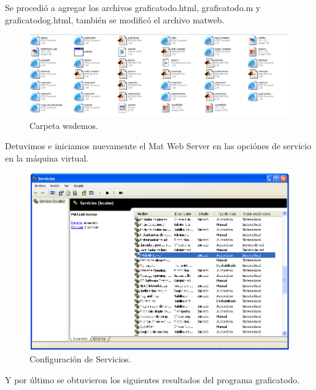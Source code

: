 \documentclass[12pt,letterpaper]{article}
\begin{document}
\begin{multicols}{2}
Se procedió a agregar los archivos graficatodo.html, graficatodo.m y graficatodog.html, también se modificó el archivo matweb.\\

\begin{figure}[H]
\centering
\includegraphics[width = \columnwidth]{wsdemos.png}
\caption{Carpeta wsdemos.}
\label{wsdemos}
\end{figure}

Detuvimos e iniciamos nuevamente el Mat Web Server en las opciónes de servicio en la máquina virtual.\\

\begin{figure}[H]
\centering
\includegraphics[width = \columnwidth]{Servicios.png}
\caption{Configuración de Servicios.}
\label{Servicios}
\end{figure}

Y por último se obtuvieron los siguientes resultados del programa graficatodo.\\


\end{multicols}
\end{document}
